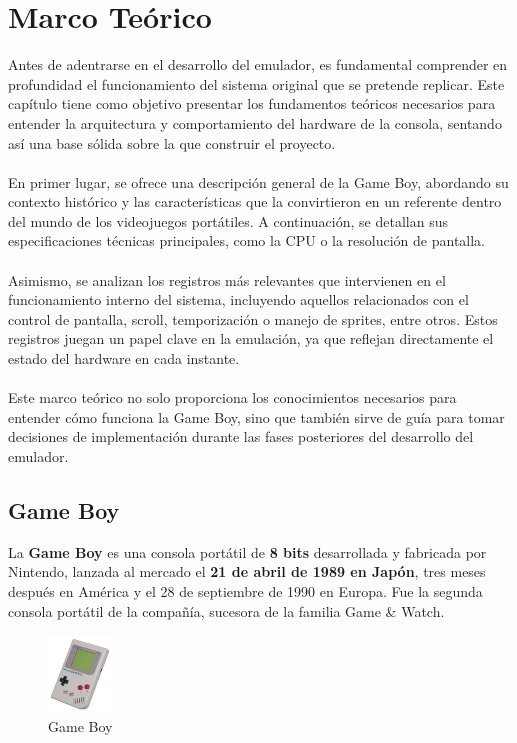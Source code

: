 \chapter{Marco Teórico}
\label{gb}

Antes de adentrarse en el desarrollo del emulador, es fundamental comprender en profundidad el funcionamiento del sistema original que se pretende replicar. Este capítulo tiene como objetivo presentar los fundamentos teóricos necesarios para entender la arquitectura y comportamiento del hardware de la consola, sentando así una base sólida sobre la que construir el proyecto.
\\\\
En primer lugar, se ofrece una descripción general de la Game Boy, abordando su contexto histórico y las características que la convirtieron en un referente dentro del mundo de los videojuegos portátiles. A continuación, se detallan sus especificaciones técnicas principales, como la CPU o la resolución de pantalla.
\\\\
Asimismo, se analizan los registros más relevantes que intervienen en el funcionamiento interno del sistema, incluyendo aquellos relacionados con el control de pantalla, scroll, temporización o manejo de sprites, entre otros. Estos registros juegan un papel clave en la emulación, ya que reflejan directamente el estado del hardware en cada instante.
\\\\
Este marco teórico no solo proporciona los conocimientos necesarios para entender cómo funciona la Game Boy, sino que también sirve de guía para tomar decisiones de implementación durante las fases posteriores del desarrollo del emulador.

\section{Game Boy}
La \textbf{Game Boy} es una consola portátil de \textbf{8 bits} desarrollada y fabricada por Nintendo, lanzada al mercado el \textbf{21 de abril de 1989 en Japón}, tres meses después en América y el 28 de septiembre de 1990 en Europa. Fue la segunda consola portátil de la compañía, sucesora de la familia Game \& Watch. \\

\begin{figure}[h]
\centering
\includegraphics[width=0.15\textwidth]{include/images/gb.jpg}
\caption{Game Boy}
\label{figure:gb}
\end{figure}


